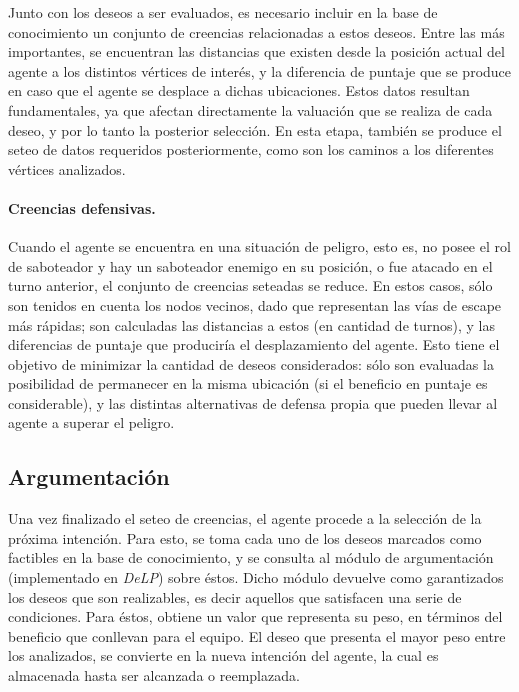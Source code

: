 \documentclass[oneside]{book}
\theoremstyle{definition}
\theoremstyle{example}
\newcommand{\DLP}{\mbox{\textit{DeLP}}}
\begin{document}
Junto con los deseos a ser evaluados, es necesario incluir en la base de conocimiento 
un conjunto de creencias relacionadas a estos deseos. Entre las más importantes, se 
encuentran las distancias que existen desde la posición actual del agente a los distintos 
vértices de interés, y la diferencia de puntaje que se produce en caso que el agente se desplace 
a dichas ubicaciones. Estos datos resultan fundamentales, ya que afectan directamente la 
valuación que se realiza de cada deseo, y por lo tanto la posterior selección. 
En esta etapa, también se produce el seteo de datos requeridos posteriormente, como son 
los caminos a los diferentes vértices analizados. 

\paragraph{Creencias defensivas.} %

Cuando el agente se encuentra en una situación de peligro, esto es, no posee el rol de 
saboteador y hay un saboteador enemigo en su posición, o fue atacado en el turno anterior, 
el conjunto de creencias seteadas se reduce. En estos casos, sólo son tenidos en cuenta 
los nodos vecinos, dado que representan las vías de escape más rápidas; son calculadas 
las distancias a estos (en cantidad de turnos), y las diferencias de puntaje que produciría 
el desplazamiento del agente. Esto tiene el objetivo de minimizar la cantidad de deseos 
considerados: sólo son evaluadas la posibilidad de permanecer en la misma ubicación 
(si el beneficio en puntaje es considerable), y las distintas alternativas de defensa 
propia que pueden llevar al agente a superar el peligro.

\subsection{Argumentación}

\label{sec:argumentacion}

Una vez finalizado el seteo de creencias, el agente procede a la selección de la próxima 
intención. Para esto, se toma cada uno de los deseos marcados como factibles en la base 
de conocimiento, y se consulta al módulo de argumentación (implementado en \DLP) sobre éstos. 
Dicho módulo
devuelve como garantizados los deseos que son realizables, es decir aquellos que satisfacen
una serie de condiciones.
Para éstos, obtiene un valor que representa su peso, en términos del 
beneficio que conllevan para el equipo. El deseo que presenta el mayor peso entre los 
analizados, se convierte en la nueva intención del agente, la cual es almacenada hasta ser 
alcanzada o reemplazada.
\end{document}
